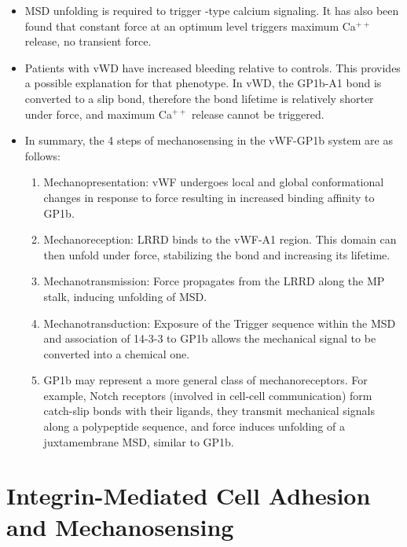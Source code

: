 \documentclass[
10pt, %
letterpaper, %
twocolumn, %
landscape %
]{article}
\newcommand{\inta}[1]{\textalpha\textsubscript{#1}}
\begin{document}
\begin{itemize}
\begin{enumerate}
  \end{enumerate}
\item MSD unfolding is required to trigger \inta{}-type calcium
  signaling. It has also been found that constant force at an optimum
  level triggers maximum Ca$^{++}$ release, no transient force.
\item Patients with vWD have increased bleeding relative to
  controls. This provides a possible explanation for that phenotype.
  In vWD, the GP1b-A1 bond is converted to a slip bond, therefore the
  bond lifetime is relatively shorter under force, and maximum
  Ca$^{++}$ release cannot be triggered.
\item In summary, the 4 steps of mechanosensing in the vWF-GP1b system
  are as follows:
  \begin{enumerate}
  \item Mechanopresentation: vWF undergoes local and global
    conformational changes in response to force resulting in increased
    binding affinity to GP1b.
  \item Mechanoreception: LRRD binds to the vWF-A1 region. This domain
    can then unfold under force, stabilizing the bond and increasing
    its lifetime.
  \item Mechanotransmission: Force propagates from the LRRD along the
    MP stalk, inducing unfolding of MSD.
  \item Mechanotransduction: Exposure of the Trigger sequence within
    the MSD and association of 14-3-3{\textzeta} to GP1b allows the
    mechanical signal to be converted into a chemical one.
  \item GP1b may represent a more general class of
    mechanoreceptors. For example, Notch receptors (involved in
    cell-cell communication) form catch-slip bonds with their ligands,
    they transmit mechanical signals along a polypeptide sequence, and
    force induces unfolding of a juxtamembrane MSD, similar to GP1b.
  \end{enumerate}
\end{itemize}


\section{Integrin-Mediated Cell Adhesion and Mechanosensing} 
\end{document}
